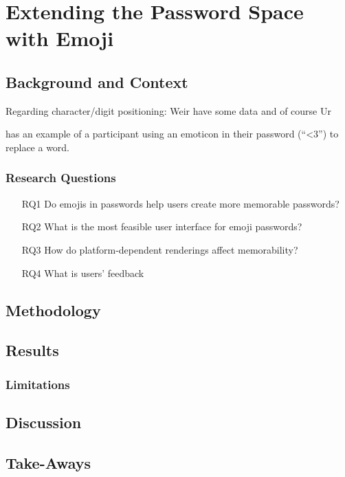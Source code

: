\chapter[Extending the Password Space with Emoji]{Extending the Password Space with Emoji}\label{chap:emojipasswords}


\section{Background and Context}

Regarding character/digit positioning: Weir \etal have some data \cite{Weir2010MetricsPolicies} and of course Ur \etal \cite{Ur2015PWCreationLab}


\cite{Kuo2006HumanSelectionMnemonic} has an example of a participant using an emoticon in their password (``<3'') to replace a word. 

\subsection{Research Questions}

\begin{itemize}
	\item[RQ1] Do emojis in passwords help users create more memorable passwords?
	\item[RQ2] What is the most feasible user interface for emoji passwords?
	\item[RQ3] How do platform-dependent renderings affect memorability?
	\item[RQ4] What is users' feedback 
\end{itemize}

\section{Methodology}


\section{Results}


\subsection{Limitations}


\section{Discussion}


\section{Take-Aways}
